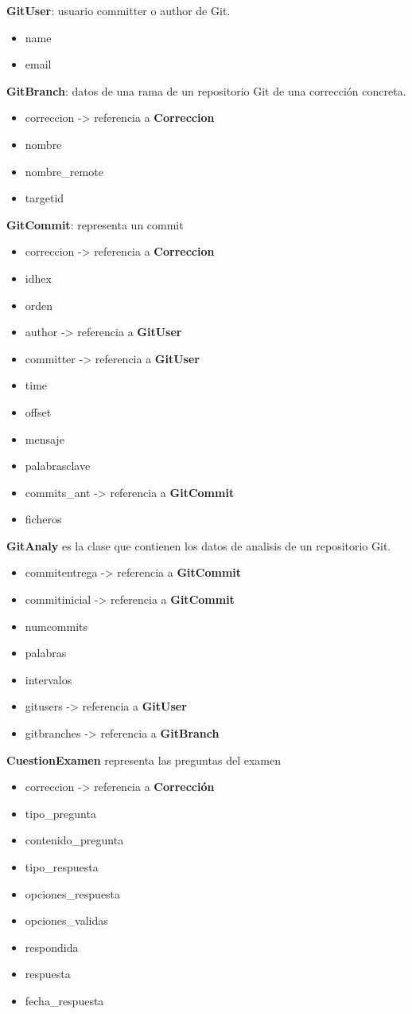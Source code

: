 \textbf{GitUser}: usuario committer o author de Git.
\begin{itemize}
\item  name
\item email
\end{itemize}


\textbf{GitBranch}: datos de una rama de un repositorio Git de una corrección concreta.
\begin{itemize}
\item correccion -> referencia a \textbf{Correccion}
\item nombre
\item nombre\_remote
\item targetid
\end{itemize}


\textbf{GitCommit}: representa un commit
\begin{itemize}
\item correccion -> referencia a \textbf{Correccion}
\item idhex
\item orden
\item author -> referencia a \textbf{GitUser}
\item committer -> referencia a \textbf{GitUser}
\item time
\item offset
\item mensaje
\item palabrasclave
\item commits\_ant -> referencia a \textbf{GitCommit}
\item ficheros
\end{itemize}


\textbf{GitAnaly} es la clase que contienen los datos de analisis de un repositorio Git.
\begin{itemize}
\item commitentrega -> referencia a \textbf{GitCommit}
\item commitinicial -> referencia a \textbf{GitCommit}
\item numcommits
\item palabras
\item intervalos
\item gitusers -> referencia a \textbf{GitUser}
\item gitbranches -> referencia a \textbf{GitBranch}
\end{itemize}


\textbf{CuestionExamen} representa las preguntas del examen
\begin{itemize}
\item correccion -> referencia a \textbf{Corrección}
\item tipo\_pregunta
\item contenido\_pregunta
\item tipo\_respuesta
\item opciones\_respuesta
\item opciones\_validas
\item respondida
\item respuesta
\item fecha\_respuesta
\end{itemize}
    
